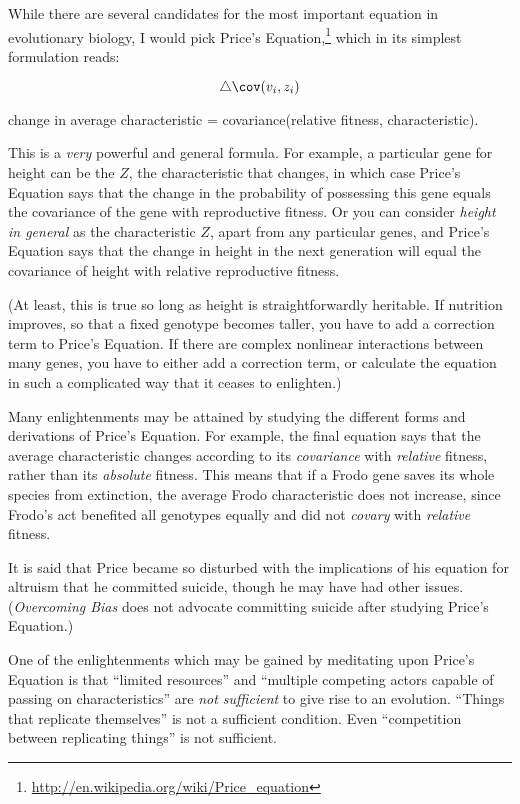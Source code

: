 {{
 While there are several candidates for the most important equation
in evolutionary biology, I would pick Price's Equation,\footnote{\url{http://en.wikipedia.org/wiki/Price_equation}}
which in its simplest formulation reads:}

\begin{equation*}
  \triangle \cov(v_{i}, z_{i})
\end{equation*}


{\centering
 change in average characteristic = covariance(relative fitness,
characteristic).
\par}


\bigskip

{
 This is a \textit{very} powerful and general formula. For example,
a particular gene for height can be the $Z$, the characteristic that
changes, in which case Price's Equation says that the
change in the probability of possessing this gene equals the covariance
of the gene with reproductive fitness. Or you can consider
\textit{height in general} as the characteristic $Z$, apart from any
particular genes, and Price's Equation says that the
change in height in the next generation will equal the covariance of
height with relative reproductive fitness. }

{
 (At least, this is true so long as height is straightforwardly
heritable. If nutrition improves, so that a fixed genotype becomes
taller, you have to add a correction term to Price's
Equation. If there are complex nonlinear interactions between many
genes, you have to either add a correction term, or calculate the
equation in such a complicated way that it ceases to enlighten.)}

{
 Many enlightenments may be attained by studying the different
forms and derivations of Price's Equation. For example,
the final equation says that the average characteristic changes
according to its \textit{covariance} with \textit{relative} fitness,
rather than its \textit{absolute} fitness. This means that if a Frodo
gene saves its whole species from extinction, the average Frodo
characteristic does not increase, since Frodo's act
benefited all genotypes equally and did not \textit{covary} with
\textit{relative} fitness.}

{
 It is said that Price became so disturbed with the implications of
his equation for altruism that he committed suicide, though he may have
had other issues. (\textit{Overcoming Bias} does not advocate
committing suicide after studying Price's Equation.)}

{
 One of the enlightenments which may be gained by meditating upon
Price's Equation is that ``limited
resources'' and ``multiple competing
actors capable of passing on characteristics'' are
\textit{not sufficient} to give rise to an evolution.
``Things that replicate themselves''
is not a sufficient condition. Even ``competition
between replicating things'' is not sufficient.}

}
